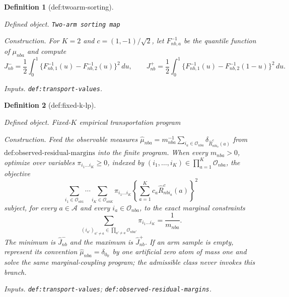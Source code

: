 \documentclass{article}
\newtheorem{definition}{Definition}
\begin{document}
\begin{definition}[def:twoarm-sorting]\label{def:twoarm-sorting}
\par\smallskip\noindent\emph{Defined object.} \texttt{Two-\allowbreak{}arm sorting map}
\par\smallskip\noindent\emph{Construction.} For \(K=2\) and \(c=(1,-1)/\sqrt2\), let \(F_{nb,a}^{-1}\) be the quantile function of \(\mu_{nba}\) and compute \[J_{nb}^{-}=\frac12\int_0^1\{F_{nb,1}^{-1}(u)-F_{nb,2}^{-1}(u)\}^2\,du,\qquad J_{nb}^{+}=\frac12\int_0^1\{F_{nb,1}^{-1}(u)-F_{nb,2}^{-1}(1-u)\}^2\,du.\]
\par\smallskip\noindent\emph{Inputs.} \texttt{def:\allowbreak{}transport-\allowbreak{}values}.
\end{definition}

\begin{definition}[def:fixed-k-lp]\label{def:fixed-k-lp}
\par\smallskip\noindent\emph{Defined object.} Fixed-\(K\) empirical transportation program
\par\smallskip\noindent\emph{Construction.} Feed the observable measures \(\widehat\mu_{nba}=m_{nba}^{-1}\sum_{i_a\in\mathcal O_{nba}}\delta_{\widehat R_{nbi_a}^{c}(a)}\) from \(\text{def:observed-residual-margins}\) into the finite program. When every \(m_{nba}>0\), optimize over variables \(\pi_{i_1\ldots i_K}\ge0\), indexed by \((i_1,\ldots,i_K)\in\prod_{a=1}^K\mathcal O_{nba}\), the objective \[\sum_{i_1\in\mathcal O_{nb1}}\cdots\sum_{i_K\in\mathcal O_{nbK}}\pi_{i_1\ldots i_K}\left\{\sum_{a=1}^Kc_a\widehat R_{nbi_a}^{c}(a)\right\}^2\] subject, for every \(a\in\mathcal A\) and every \(i_a\in\mathcal O_{nba}\), to the exact marginal constraints \[\sum_{(i_{a'})_{a'\ne a}\in\prod_{a'\ne a}\mathcal O_{nba'}}\pi_{i_1\ldots i_K}=\frac1{m_{nba}}.\] The minimum is \(\widehat J_{nb}^{-}\) and the maximum is \(\widehat J_{nb}^{+}\). If an arm sample is empty, represent its convention \(\widehat\mu_{nba}=\delta_{0_{\mathbb R}}\) by one artificial zero atom of mass one and solve the same marginal-coupling program; the admissible class never invokes this branch.
\par\smallskip\noindent\emph{Inputs.} \texttt{def:\allowbreak{}transport-\allowbreak{}values}; \texttt{def:\allowbreak{}observed-\allowbreak{}residual-\allowbreak{}margins}.
\end{definition}
\end{document}
